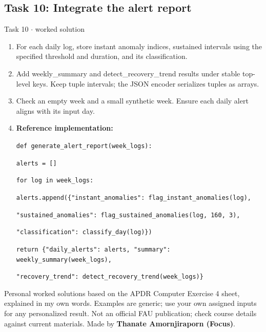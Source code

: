 \documentclass[11pt]{article}
\begin{document}
\begin{keepsection}\subsection{Task 10: Integrate the alert report}

\begin{workedbox}{Task 10 \ensuremath{\cdot} worked solution}
\begin{enumerate}
\item For each daily log, store instant anomaly indices, sustained intervals using the specified threshold and duration, and its classification.
\item Add weekly\_summary and detect\_recovery\_trend results under stable top-level keys. Keep tuple intervals; the JSON encoder serializes tuples as arrays.
\item Check an empty week and a small synthetic week. Ensure each daily alert aligns with its input day.
\item {}
\textbf{Reference implementation:}
\begin{tcolorbox}[colback=Paperblue,colframe=Paperblue,boxrule=0pt,arc=0pt,left=7pt,right=7pt,top=5pt,bottom=5pt]\small\sloppy
\noindent\hspace*{0em}\texttt{def generate\_alert\_report(week\_logs):}\par
\noindent\hspace*{1em}\texttt{alerts = []}\par
\noindent\hspace*{1em}\texttt{for log in week\_logs:}\par
\noindent\hspace*{3em}\texttt{alerts.append(\{"instant\_anomalies": flag\_instant\_anomalies(log),}\par
\noindent\hspace*{10em}\texttt{"sustained\_anomalies": flag\_sustained\_anomalies(log, 160, 3),}\par
\noindent\hspace*{10em}\texttt{"classification": classify\_day(log)\})}\par
\noindent\hspace*{1em}\texttt{return \{"daily\_alerts": alerts, "summary": weekly\_summary(week\_logs),}\par
\noindent\hspace*{5em}\texttt{"recovery\_trend": detect\_recovery\_trend(week\_logs)\}}\par
\end{tcolorbox}
\end{enumerate}
\end{workedbox}

\end{keepsection}

\vfill{\small Personal worked solutions based on the APDR Computer Exercise 4 sheet, explained in my own words. Examples are generic; use your own assigned inputs for any personalized result. Not an official FAU publication; check course details against current materials. Made by \textbf{Thanate Amornjiraporn (Focus)}.}
\end{document}
